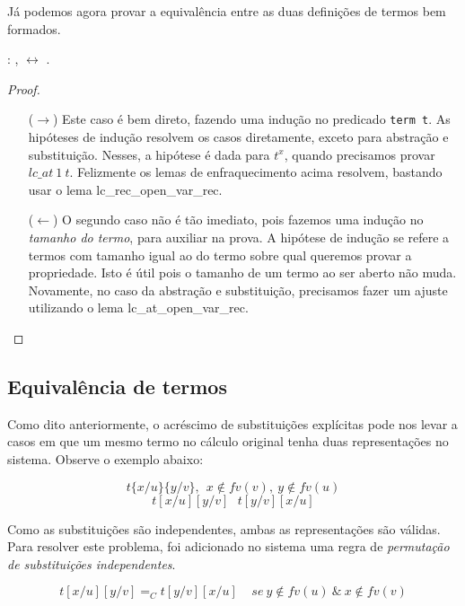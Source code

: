 Já podemos agora provar a equivalência entre as duas definições de termos bem
formados.

\bigskip
{}  : \coqdockw{\ensuremath{\forall}}
,   \ensuremath{\leftrightarrow}
 .\coqdoceol
\bigskip

\begin{proof}
\begin{itemize}
    \item[($\rightarrow$)] Este caso é bem direto, fazendo uma indução no
        predicado \texttt{term t}. As hipóteses de indução resolvem os casos
        diretamente, exceto para abstração e substituição. Nesses, a hipótese é
        dada para $t^x$, quando precisamos provar $lc\_at\ 1\ t$. Felizmente os
        lemas de enfraquecimento acima resolvem, bastando usar o lema
        lc\_rec\_open\_var\_rec.
    \item[($\leftarrow$)] O segundo caso não é tão imediato, pois fazemos uma
        indução no \emph{tamanho do termo}, para auxiliar na prova. A hipótese
        de indução se refere a termos com tamanho igual ao do termo sobre qual
        queremos provar a propriedade. Isto é útil pois o tamanho de um termo ao
        ser aberto não muda. Novamente, no caso da abstração e substituição,
        precisamos fazer um ajuste utilizando o lema lc\_at\_open\_var\_rec.
\end{itemize}
\end{proof}

\subsection{Equivalência de termos}
\label{sub:equival_ncia_de_termos}

Como dito anteriormente, o acréscimo de substituições explícitas pode nos levar
a casos em que um mesmo termo no cálculo original tenha duas representações no
sistema. Observe o exemplo abaixo:

\[ t\{x/u\}\{y/v\},\ \ x \notin fv(v),\ y \notin fv(u) \]
\[ t[x/u][y/v]\ \ \ t[y/v][x/u]\]

Como as substituições são independentes, ambas as representações são válidas.
Para resolver este problema, foi adicionado no sistema uma regra de
\emph{permutação de substituições independentes}.

\[ t[x/u][y/v] =_C t[y/v][x/u] \ \ \ \ \ se\ y \notin fv(u)\ \&\ x \notin fv(v)\] 

